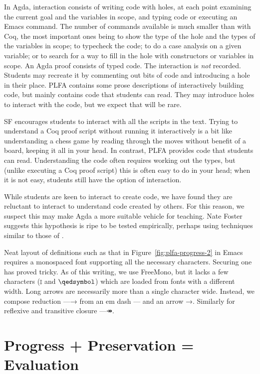 \documentclass[preprint,authoryear]{elsarticle}
\begin{document}
In Agda, interaction consists of writing code with holes, at each
point examining the current goal and the variables in scope, and
typing code or executing an Emacs command.  The number of commands
available is much smaller than with Coq, the most important ones being
to show the type of the hole and the types of the variables in scope;
to typecheck the code; to do a case analysis on a given variable; or to
search for a way to fill in the hole with constructors or variables in scope.
An Agda proof consists of typed code.  The interaction is \emph{not}
recorded.  Students may recreate it by commenting out bits of code and
introducing a hole in their place.   PLFA contains some prose descriptions
of interactively building code, but mainly contains code that students
can read.  They may introduce holes to interact with the code, but
we expect that will be rare.

SF encourages students to interact with all the scripts in the text.
Trying to understand a Coq proof script without running it
interactively is a bit like understanding a chess game by reading
through the moves without benefit of a board, keeping it all in your
head.  In contrast, PLFA provides code that students can read.
Understanding the code often requires working out the types, but
(unlike executing a Coq proof script) this is often easy to do in your
head; when it is not easy, students still have the option of
interaction.

While students are keen to interact to create code, we have found they
are reluctant to interact to understand code created by others. For
this reason, we suspect this may make Agda a more suitable vehicle for
teaching.  Nate Foster suggests this hypothesis is ripe to be tested
empirically, perhaps using techniques similar to those of
\citet{Danas-et-al-2017}.

Neat layout of definitions such as that in
Figure~\ref{fig:plfa-progress-2} in Emacs requires a monospaced font
supporting all the necessary characters.  Securing one has proved
tricky. As of this writing, we use FreeMono, but it lacks a few
characters ($\typecolon$ and $\qedsymbol$) which are loaded from fonts with a different
width.  Long arrows are necessarily more than a single character wide.
Instead, we compose reduction —→ from an em dash — and an arrow →.
Similarly for reflexive and transitive closure —↠.

\section{Progress + Preservation = Evaluation}
\end{document}

